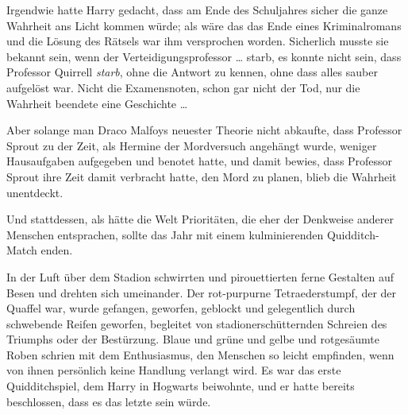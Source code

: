 Irgendwie hatte Harry gedacht, dass am Ende des Schuljahres sicher die ganze Wahrheit ans Licht kommen würde; als wäre das das Ende eines Kriminalromans und die Lösung des Rätsels war ihm versprochen worden. Sicherlich musste sie bekannt sein, wenn der Verteidigungsprofessor … starb, es konnte nicht sein, dass Professor Quirrell \emph{starb}, ohne die Antwort zu kennen, ohne dass alles sauber aufgelöst war. Nicht die Examensnoten, schon gar nicht der Tod, nur die Wahrheit beendete eine Geschichte …

Aber solange man Draco Malfoys neuester Theorie nicht abkaufte, dass Professor Sprout zu der Zeit, als Hermine der Mordversuch angehängt wurde, weniger Hausaufgaben aufgegeben und benotet hatte, und damit bewies, dass Professor Sprout ihre Zeit damit verbracht hatte, den Mord zu planen, blieb die Wahrheit unentdeckt.

Und stattdessen, als hätte die Welt Prioritäten, die eher der Denkweise anderer Menschen entsprachen, sollte das Jahr mit einem kulminierenden Quidditch-Match enden.

\later

In der Luft über dem Stadion schwirrten und pirouettierten ferne Gestalten auf Besen und drehten sich umeinander. Der rot-purpurne Tetraederstumpf, der der Quaffel war, wurde gefangen, geworfen, geblockt und gelegentlich durch schwebende Reifen geworfen, begleitet von stadionerschütternden Schreien des Triumphs oder der Bestürzung. Blaue und grüne und gelbe und rotgesäumte Roben schrien mit dem Enthusiasmus, den Menschen so leicht empfinden, wenn von ihnen persönlich keine Handlung verlangt wird. Es war das erste Quidditchspiel, dem Harry in Hogwarts beiwohnte, und er hatte bereits beschlossen, dass es das letzte sein würde.

